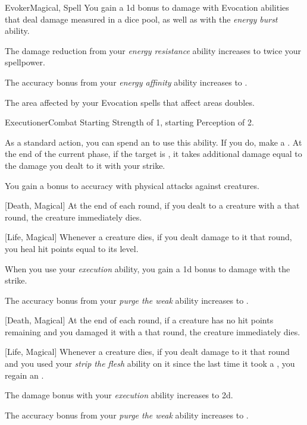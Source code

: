 \begin{feat}{Evoker}{Magical, Spell}
         You gain a \plus1d bonus to damage with Evocation abilities that deal damage measured in a dice pool, as well as with the \textit{energy burst} ability.

         The damage reduction from your \textit{energy resistance} ability increases to twice your spellpower.

         The accuracy bonus from your \textit{energy affinity} ability increases to .

         The area affected by your Evocation spells that affect areas doubles.
    \end{feat}

    \begin{feat}{Executioner}{Combat}
        \featpres Starting Strength of 1, starting Perception of 2.
        \featben

         As a standard action, you can spend an  to use this ability.
        If you do, make a .
        At the end of the current phase, if the target is , it takes additional damage equal to the damage you dealt to it with your strike.

         You gain a  bonus to accuracy with physical attacks against  creatures.

        [Death, Magical] At the end of each round, if you dealt  to a creature with a  that round, the creature immediately dies.

        [Life, Magical] Whenever a creature dies, if you dealt damage to it that round, you heal hit points equal to its level.

         When you use your \textit{execution} ability, you gain a \plus1d bonus to damage with the strike.

         The accuracy bonus from your \textit{purge the weak} ability increases to .

        [Death, Magical] At the end of each round, if a creature has no hit points remaining and you damaged it with a  that round, the creature immediately dies.

        [Life, Magical] Whenever a creature dies, if you dealt damage to it that round and you used your \textit{strip the flesh} ability on it since the last time it took a , you regain an .

         The damage bonus with your \textit{execution} ability increases to \plus2d.

         The accuracy bonus from your \textit{purge the weak} ability increases to .
    \end{feat}

